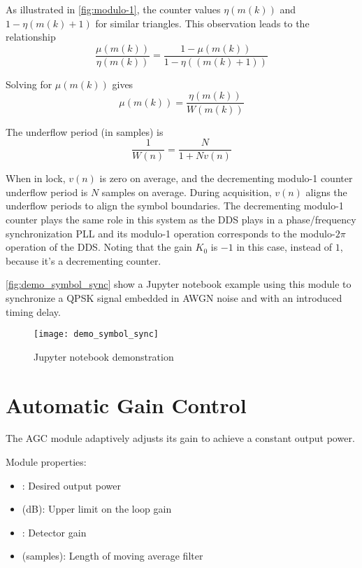 As illustrated in \autoref{fig:modulo-1}, the counter values $\eta(m(k))$ and $1-\eta(m(k)+1)$ for similar triangles. This observation leads to the relationship
\begin{equation}
\frac{\mu(m(k))}{\eta(m(k))}=\frac{1-\mu(m(k))}{1-\eta((m(k)+1))}
\end{equation}

Solving for $\mu(m(k))$ gives
\begin{equation}
\mu(m(k))=\frac{\eta(m(k))}{W(m(k))}
\end{equation}

The underflow period (in samples) is
\begin{equation}
\frac{1}{W(n)}=\frac{N}{1+Nv(n)}
\end{equation}

When in lock, $v(n)$ is zero on average, and the decrementing modulo-1 counter underflow period is $N$ samples on average. During acquisition, $v(n)$ aligns the underflow periods to align the symbol boundaries. The decrementing modulo-1 counter plays the same role in this system as the DDS plays in a phase/frequency synchronization PLL and its modulo-1 operation corresponds to the modulo-$2\pi$ operation of the DDS. Noting that the gain $K_0$ is $-1$ in this case, instead of $1$, because it's a decrementing counter.

\autoref{fig:demo_symbol_sync} show a Jupyter notebook example using this module to synchronize a QPSK signal embedded in AWGN noise and with an introduced timing delay.

\begin{figure}[H]
  \centering
  \texttt{[image: demo\_symbol\_sync]}
  \caption{ Jupyter notebook demonstration}
  \label{fig:demo_symbol_sync}
\end{figure}

\section{Automatic Gain Control}

The AGC module adaptively adjusts its gain to achieve a constant output power.

\noindent Module properties:
\begin{itemize}
  \item {}: Desired output power
  \item {} (dB): Upper limit on the loop gain
  \item {}: Detector gain
  \item {} (samples): Length of moving average filter
\end{itemize}

